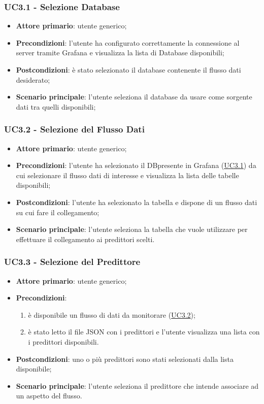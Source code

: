 		\label{par:UC3.1}
		\subsubsection{UC3.1 - Selezione Database}
		\begin{itemize}
			\item\textbf{Attore primario}: utente generico;
			\item\textbf{Precondizioni}: l’utente ha configurato correttamente la connessione al server tramite Grafana e visualizza la lista di Database disponibili;
			\item\textbf{Postcondizioni}: è stato selezionato il database contenente il flusso dati desiderato;
			\item\textbf{Scenario principale}: l’utente seleziona il database da usare come sorgente dati tra quelli disponibili;
		\end{itemize}
		
		\label{par:UC3.2}
		\subsubsection{UC3.2 - Selezione del Flusso Dati}
		\begin{itemize}
			\item\textbf{Attore primario}: utente generico;
			\item\textbf{Precondizioni}: l’utente ha selezionato il DB\glo presente in Grafana (\hyperref[par:UC3.1]{UC3.1}) da cui selezionare il flusso dati di interesse e visualizza la lista delle tabelle disponibili;
			\item\textbf{Postcondizioni}: l’utente ha selezionato la tabella e dispone di un flusso dati su cui fare il collegamento;
			\item\textbf{Scenario principale}: l’utente seleziona la tabella che vuole utilizzare per effettuare il collegamento ai predittori scelti.
		\end{itemize}
		
		\label{par:UC3.3}
		\subsubsection{UC3.3 - Selezione del Predittore}
		\begin{itemize}
			\item\textbf{Attore primario}: utente generico;
			\item\textbf{Precondizioni}:
				\begin{enumerate}
					\item è disponibile un flusso di dati da monitorare (\hyperref[par:UC3.2]{UC3.2});
					\item è stato letto il file JSON con i predittori e l'utente visualizza una lista con i predittori disponibili.
				\end{enumerate}
			\item\textbf{Postcondizioni}: uno o più predittori sono stati selezionati dalla lista disponibile;
			\item\textbf{Scenario principale}: l’utente seleziona il predittore che intende associare ad un aspetto del flusso.
		\end{itemize}
	
